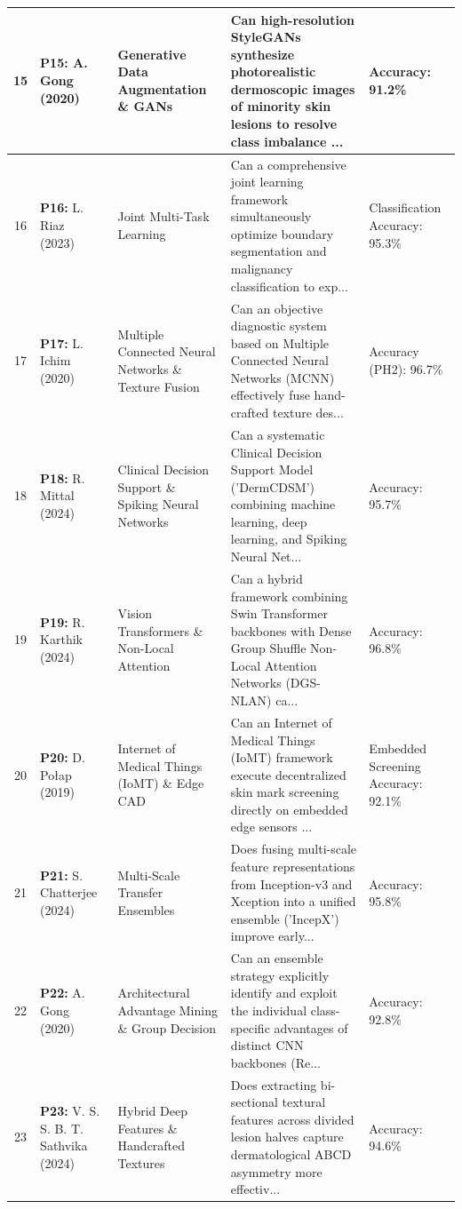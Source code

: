 \begin{small}
\begin{longtable}{|c|p{3.2cm}|p{2.8cm}|p{5.2cm}|p{2.4cm}|}
15 & \textbf{P15:} A. Gong (2020)~\cite{9062473} & Generative Data Augmentation \& GANs & Can high-resolution StyleGANs synthesize photorealistic dermoscopic images of minority skin lesions to resolve class imbalance ... & Accuracy: 91.2\% \\ \hline
16 & \textbf{P16:} L. Riaz (2023)~\cite{10189856} & Joint Multi-Task Learning & Can a comprehensive joint learning framework simultaneously optimize boundary segmentation and malignancy classification to exp... & Classification Accuracy: 95.3\% \\ \hline
17 & \textbf{P17:} L. Ichim (2020)~\cite{9210626} & Multiple Connected Neural Networks \& Texture Fusion & Can an objective diagnostic system based on Multiple Connected Neural Networks (MCNN) effectively fuse hand-crafted texture des... & Accuracy (PH2): 96.7\% \\ \hline
18 & \textbf{P18:} R. Mittal (2024)~\cite{10459206} & Clinical Decision Support \& Spiking Neural Networks & Can a systematic Clinical Decision Support Model ('DermCDSM') combining machine learning, deep learning, and Spiking Neural Net... & Accuracy: 95.7\% \\ \hline
19 & \textbf{P19:} R. Karthik (2024)~\cite{10731679} & Vision Transformers \& Non-Local Attention & Can a hybrid framework combining Swin Transformer backbones with Dense Group Shuffle Non-Local Attention Networks (DGS-NLAN) ca... & Accuracy: 96.8\% \\ \hline
20 & \textbf{P20:} D. Połap (2019)~\cite{8868149} & Internet of Medical Things (IoMT) \& Edge CAD & Can an Internet of Medical Things (IoMT) framework execute decentralized skin mark screening directly on embedded edge sensors ... & Embedded Screening Accuracy: 92.1\% \\ \hline
21 & \textbf{P21:} S. Chatterjee (2024)~\cite{10608138} & Multi-Scale Transfer Ensembles & Does fusing multi-scale feature representations from Inception-v3 and Xception into a unified ensemble ('IncepX') improve early... & Accuracy: 95.8\% \\ \hline
22 & \textbf{P22:} A. Gong (2020)~\cite{9175002} & Architectural Advantage Mining \& Group Decision & Can an ensemble strategy explicitly identify and exploit the individual class-specific advantages of distinct CNN backbones (Re... & Accuracy: 92.8\% \\ \hline
23 & \textbf{P23:} V. S. S. B. T. Sathvika (2024)~\cite{10496674} & Hybrid Deep Features \& Handcrafted Textures & Does extracting bi-sectional textural features across divided lesion halves capture dermatological ABCD asymmetry more effectiv... & Accuracy: 94.6\% \\ \hline

\end{longtable}
\end{small}
